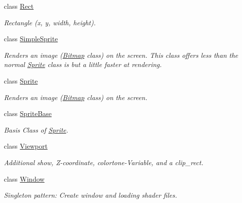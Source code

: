 \begin{DoxyCompactItemize}
class \hyperlink{class_f2_c_1_1_rect}{Rect}
\begin{DoxyCompactList}\small\item\em Rectangle (x, y, width, height). \item\end{DoxyCompactList}\item 
class \hyperlink{class_f2_c_1_1_simple_sprite}{SimpleSprite}
\begin{DoxyCompactList}\small\item\em Renders an image (\hyperlink{class_f2_c_1_1_bitmap}{Bitmap} class) on the screen. This class offers less than the normal \hyperlink{class_f2_c_1_1_sprite}{Sprite} class is but a little faster at rendering. \item\end{DoxyCompactList}\item 
class \hyperlink{class_f2_c_1_1_sprite}{Sprite}
\begin{DoxyCompactList}\small\item\em Renders an image (\hyperlink{class_f2_c_1_1_bitmap}{Bitmap} class) on the screen. \item\end{DoxyCompactList}\item 
class \hyperlink{class_f2_c_1_1_sprite_base}{SpriteBase}
\begin{DoxyCompactList}\small\item\em Basis Class of \hyperlink{class_f2_c_1_1_sprite}{Sprite}. \item\end{DoxyCompactList}\item 
class \hyperlink{class_f2_c_1_1_viewport}{Viewport}
\begin{DoxyCompactList}\small\item\em Additional show, Z-\/coordinate, colortone-\/Variable, and a clip\_\-rect. \item\end{DoxyCompactList}\item 
class \hyperlink{class_f2_c_1_1_window}{Window}
\begin{DoxyCompactList}\small\item\em Singleton pattern: Create window and loading shader files. \item\end{DoxyCompactList}\end{DoxyCompactItemize}
